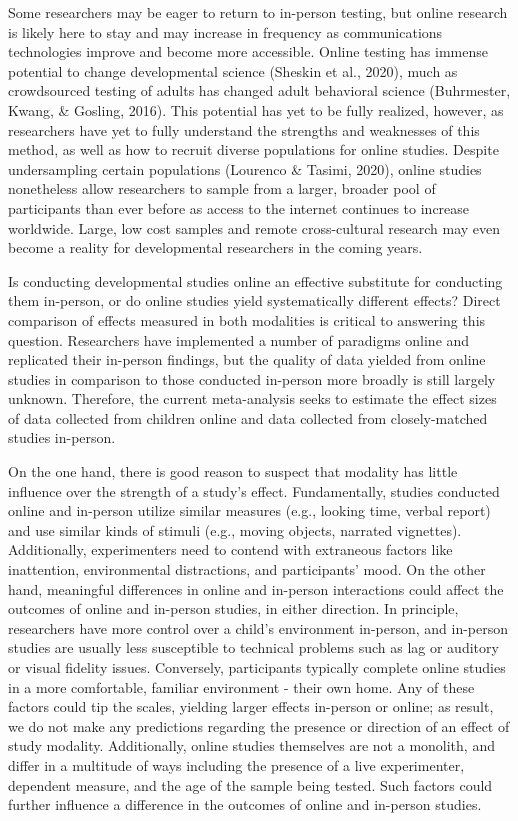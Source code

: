 \documentclass[
  man,floatsintext]{apa6}
\begin{document}
Some researchers may be eager to return to in-person testing, but online research is likely here to stay and may increase in frequency as communications technologies improve and become more accessible. Online testing has immense potential to change developmental science (Sheskin et al., 2020), much as crowdsourced testing of adults has changed adult behavioral science (Buhrmester, Kwang, \& Gosling, 2016). This potential has yet to be fully realized, however, as researchers have yet to fully understand the strengths and weaknesses of this method, as well as how to recruit diverse populations for online studies. Despite undersampling certain populations (Lourenco \& Tasimi, 2020), online studies nonetheless allow researchers to sample from a larger, broader pool of participants than ever before as access to the internet continues to increase worldwide. Large, low cost samples and remote cross-cultural research may even become a reality for developmental researchers in the coming years.

Is conducting developmental studies online an effective substitute for conducting them in-person, or do online studies yield systematically different effects? Direct comparison of effects measured in both modalities is critical to answering this question. Researchers have implemented a number of paradigms online and replicated their in-person findings, but the quality of data yielded from online studies in comparison to those conducted in-person more broadly is still largely unknown. Therefore, the current meta-analysis seeks to estimate the effect sizes of data collected from children online and data collected from closely-matched studies in-person.

On the one hand, there is good reason to suspect that modality has little influence over the strength of a study's effect. Fundamentally, studies conducted online and in-person utilize similar measures (e.g., looking time, verbal report) and use similar kinds of stimuli (e.g., moving objects, narrated vignettes). Additionally, experimenters need to contend with extraneous factors like inattention, environmental distractions, and participants' mood. On the other hand, meaningful differences in online and in-person interactions could affect the outcomes of online and in-person studies, in either direction. In principle, researchers have more control over a child's environment in-person, and in-person studies are usually less susceptible to technical problems such as lag or auditory or visual fidelity issues. Conversely, participants typically complete online studies in a more comfortable, familiar environment - their own home. Any of these factors could tip the scales, yielding larger effects in-person or online; as result, we do not make any predictions regarding the presence or direction of an effect of study modality. Additionally, online studies themselves are not a monolith, and differ in a multitude of ways including the presence of a live experimenter, dependent measure, and the age of the sample being tested. Such factors could further influence a difference in the outcomes of online and in-person studies.
\end{document}
